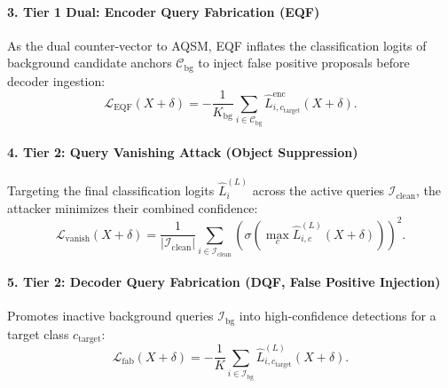 \documentclass[preprint,12pt]{elsarticle}
\begin{document}
\paragraph{3. Tier 1 Dual: Encoder Query Fabrication (EQF)}
As the dual counter-vector to AQSM, EQF inflates the classification logits of background candidate anchors $\mathcal{C}_{\mathrm{bg}}$ to inject false positive proposals before decoder ingestion:
\begin{equation}
    \mathcal{L}_{\mathrm{EQF}}(X + \delta) = - \frac{1}{K_{\mathrm{bg}}} \sum_{i \in \mathcal{C}_{\mathrm{bg}}} \hat{L}_{i, c_{\mathrm{target}}}^{\mathrm{enc}}(X + \delta).
\end{equation}

\paragraph{4. Tier 2: Query Vanishing Attack (Object Suppression)}
Targeting the final classification logits $\hat{L}_i^{(L)}$ across the active queries $\mathcal{I}_{\mathrm{clean}}$, the attacker minimizes their combined confidence:
\begin{equation}
    \mathcal{L}_{\mathrm{vanish}}(X + \delta) = \frac{1}{|\mathcal{I}_{\mathrm{clean}}|} \sum_{i \in \mathcal{I}_{\mathrm{clean}}} \left( \sigma\left( \max_{c} \hat{L}_{i, c}^{(L)}(X + \delta) \right) \right)^2.
\end{equation}

\paragraph{5. Tier 2: Decoder Query Fabrication (DQF, False Positive Injection)}
Promotes inactive background queries $\mathcal{I}_{\mathrm{bg}}$ into high-confidence detections for a target class $c_{\mathrm{target}}$:
\begin{equation}
    \mathcal{L}_{\mathrm{fab}}(X + \delta) = - \frac{1}{K} \sum_{i \in \mathcal{I}_{\mathrm{bg}}} \hat{L}_{i, c_{\mathrm{target}}}^{(L)}(X + \delta).
\end{equation}
\end{document}
